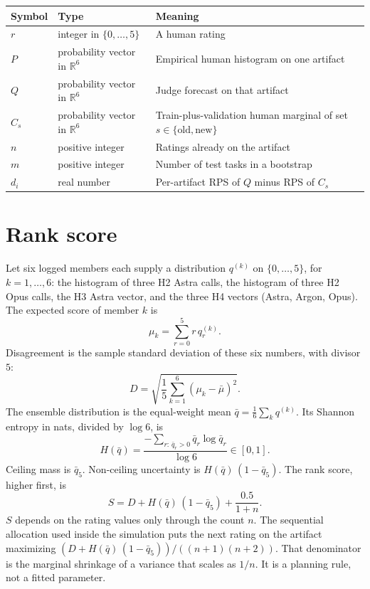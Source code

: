 \documentclass[11pt]{article}
\begin{document}
\begin{center}
\begin{tabular}{@{}llp{8.2cm}@{}}
\toprule
Symbol & Type & Meaning \\
\midrule
$r$ & integer in $\{0,\ldots,5\}$ & A human rating \\
$P$ & probability vector in $\mathbb{R}^6$ & Empirical human histogram on one artifact \\
$Q$ & probability vector in $\mathbb{R}^6$ & Judge forecast on that artifact \\
$C_s$ & probability vector in $\mathbb{R}^6$ & Train-plus-validation human marginal of set $s\in\{\text{old},\text{new}\}$ \\
$n$ & positive integer & Ratings already on the artifact \\
$m$ & positive integer & Number of test tasks in a bootstrap \\
$d_i$ & real number & Per-artifact RPS of $Q$ minus RPS of $C_s$ \\
\bottomrule
\end{tabular}
\end{center}

\section*{Rank score}

Let six logged members each supply a distribution $q^{(k)}$ on $\{0,\ldots,5\}$, for $k=1,\ldots,6$: the histogram of three H2 Astra calls, the histogram of three H2 Opus calls, the H3 Astra vector, and the three H4 vectors (Astra, Argon, Opus). The expected score of member $k$ is
\begin{equation}
\mu_k = \sum_{r=0}^{5} r\, q^{(k)}_r.
\end{equation}
Disagreement is the sample standard deviation of these six numbers, with divisor $5$:
\begin{equation}
D = \sqrt{\frac{1}{5}\sum_{k=1}^{6}(\mu_k-\bar\mu)^2}.
\end{equation}
The ensemble distribution is the equal-weight mean $\bar q = \frac16\sum_k q^{(k)}$. Its Shannon entropy in nats, divided by $\log 6$, is
\begin{equation}
H(\bar q) = \frac{-\sum_{r:\,\bar q_r>0}\bar q_r\log\bar q_r}{\log 6}\in[0,1].
\end{equation}
Ceiling mass is $\bar q_5$. Non-ceiling uncertainty is $H(\bar q)\,(1-\bar q_5)$. The rank score, higher first, is
\begin{equation}
\boxed{S = D + H(\bar q)\,(1-\bar q_5) + \frac{0.5}{1+n}.}
\end{equation}
$S$ depends on the rating values only through the count $n$. The sequential allocation used inside the simulation puts the next rating on the artifact maximizing $(D+H(\bar q)\,(1-\bar q_5))/((n+1)(n+2))$. That denominator is the marginal shrinkage of a variance that scales as $1/n$. It is a planning rule, not a fitted parameter.
\end{document}
